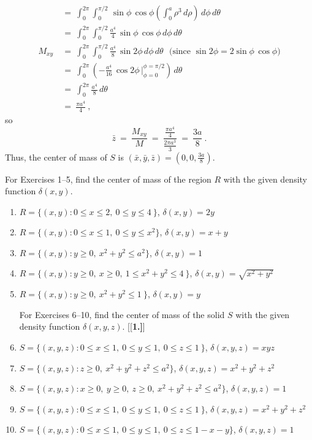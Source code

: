 \begin{exmp}
\begin{align*}
  &=~ \int_0^{2\pi} \int_0^{\pi /2} \,\sin \phi \,\cos \phi \left( \int_0^a \rho^3 \,d\rho \right) \,d\phi\,d\theta\\[8pt]
  &=~ \int_0^{2\pi} \int_0^{\pi /2} \tfrac{a^4}{4}\,\sin \phi\,\cos \phi\,d\phi\,d\theta\\[8pt]
  M_{xy} ~&=~ \int_0^{2\pi} \int_0^{\pi /2} \tfrac{a^4}{8}\,\sin 2\phi\,d\phi\,d\theta ~~~\text{(since $\sin 2\phi =
  2\sin \phi \, \cos \phi$)}\\[8pt]
  &=~ \int_0^{2\pi} \left(  -\tfrac{a^4}{16}\,\cos 2\phi\,\Big|_{\phi=0}^{\phi=\pi /2} \right) \,d\theta\\[8pt]
  &=~ \int_0^{2\pi} \tfrac{a^4}{8}\,d\theta\\
  &=~ \frac{\pi a^4}{4}~,
 \end{align*}
 so
 \begin{displaymath}
  \bar{z} ~=~ \frac{M_{xy}}{M} ~=~ \frac{\tfrac{\pi a^4}{4}}{\tfrac{2\pi a^3}{3}} ~=~ \frac{3a}{8} ~.
 \end{displaymath}
 Thus, the center of mass of $S$ is $(\bar{x},\bar{y},\bar{z}) = \left( 0,0,\frac{3a}{8} \right)$.
\end{exmp}
\startexercises\label{sec3dot6}
\par\noindent For Exercises 1--5, find the center of mass of the region $R$ with the given density function
$\delta(x,y)$.
\begin{enumerate}[\bfseries 1.]
 \item $R = \lbrace (x,y): 0 \le x \le 2,~ 0 \le y \le 4~ \rbrace$, $\delta(x,y) = 2y$
 \item $R = \lbrace (x,y): 0 \le x \le 1,~ 0 \le y \le x^2 \rbrace$, $\delta(x,y) = x+y$
 \item $R = \lbrace (x,y): y \ge 0, ~x^2 + y^2 \le a^2 \rbrace$, $\delta(x,y) = 1$
 \item $R = \lbrace (x,y): y \ge 0,~ x \ge 0, ~ 1 \le x^2 + y^2 \le 4~ \rbrace$, $\delta(x,y) = \sqrt{x^2 + y^2}$
 \item $R = \lbrace (x,y): y \ge 0, ~x^2 + y^2 \le 1~ \rbrace$, $\delta(x,y) = y$
\par\noindent For Exercises 6--10, find the center of mass of the solid $S$ with the given density function
$\delta(x,y,z)$.
[{[\bfseries 1.]}]
 \item $S = \lbrace (x,y,z): 0 \le x \le 1,~ 0 \le y \le 1,~ 0 \le z \le 1~ \rbrace$, $\delta(x,y,z) = xyz$
 \item $S = \lbrace (x,y,z): z \ge 0,~ x^2 + y^2 + z^2 \le a^2 \rbrace$, $\delta(x,y,z) = x^2 + y^2 + z^2$
 \item $S = \lbrace (x,y,z): x \ge 0,~ y \ge 0,~ z \ge 0, ~x^2 + y^2 + z^2 \le a^2 \rbrace$, $\delta(x,y,z) = 1$
 \item $S = \lbrace (x,y,z): 0 \le x \le 1,~ 0 \le y \le 1,~ 0 \le z \le 1~ \rbrace$, $\delta(x,y,z) = x^2 + y^2 + z^2$
 \item $S = \lbrace (x,y,z): 0 \le x \le 1,~ 0 \le y \le 1,~ 0 \le z \le 1 - x - y \rbrace$, $\delta(x,y,z) = 1$
\end{enumerate}
\newpage
